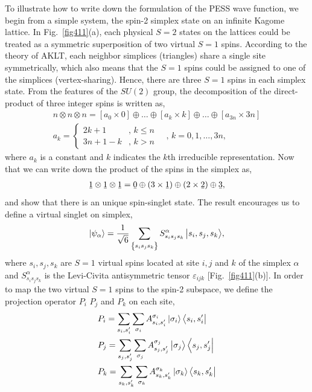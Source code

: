 To illustrate how to write down the formulation of the PESS wave function, we begin from a simple system, the spin-2 simplex state on an infinite Kagome lattice. In Fig.~\ref{fig411}(a), each physical $S=2$ states on the lattices could be treated as a symmetric superposition of two virtual $S=1$ spins. According to the theory of AKLT, each neighbor simplices (triangles) share a single site symmetrically, which also means that the $S=1$ spins could be assigned to one of the simplices (vertex-sharing). Hence, there are three $S=1$ spins in each simplex state. From the features of the $SU(2)$ group, the decomposition of the direct-product of three integer spins is written as, 
\begin{align}
	\label{su2}
	n \otimes n \otimes n = [a_0 \times 0] \oplus \dots \oplus [a_k \times k] \oplus \dots \oplus [a_{3n} \times 3n] \\
	a_k = \begin{cases}
		2k + 1 & \text{, $k \leq n$} \\
		3n + 1 - k & \text{, $k > n$} 
	\end{cases}
	\quad \text{, } k = 0, 1, \dots , 3n ,
\end{align}
where $a_k$ is a constant and $k$ indicates the $k$th irreducible representation. Now that we can write down the product of the spins in the simplex as,  
\begin{align}
	\label{111}
	\barbelow{1} \otimes \barbelow{1} \otimes \barbelow{1} = \barbelow{0} \oplus \left( 3 \times \barbelow{1} \right) \oplus \left( 2 \times \barbelow{2} \right) \oplus \barbelow{3},
\end{align}
and show that there is an unique spin-singlet state. The result encourages us to define a virtual singlet on simplex,
\begin{align}
	\Ket{\psi_{\alpha}} = \frac{1}{\sqrt{6}} \sum_{\left\{ s_i s_j s_k\right\}}{S^{\alpha}_{s_i s_j s_k}\Ket{s_i, s_j, s_k}},
\end{align}
where $s_i,s_j,s_k$ are $S=1$ virtual spins located at site $i,j$ and $k$ of the simplex $\alpha$ and $S^{\alpha}_{s_i s_j s_k}$ is the Levi-Civita antisymmetric tensor $\varepsilon_{ijk}$ [Fig.~\ref{fig411}(b)]. In order to map the two virtual $S=1$ spins to the spin-2 subspace, we define the projection operator $P_i$ $P_j$ and $P_k$ on each site,
\begin{align}
	&P_i = \sum_{s_i,s^{\prime}_{i}}\sum_{\sigma_i}{A^{\sigma_i}_{s_i,s_i^{\prime}}\Ket{\sigma_i}\Bra{s_i,s_i^{\prime}}} \\
	&P_j = \sum_{s_j,s^{\prime}_{j}}\sum_{\sigma_j}{A^{\sigma_j}_{s_j,s_j^{\prime}}\Ket{\sigma_j}\Bra{s_j,s_j^{\prime}}} \\
	&P_k = \sum_{s_k,s^{\prime}_{k}}\sum_{\sigma_k}{A^{\sigma_k}_{s_k,s_k^{\prime}}\Ket{\sigma_k}\Bra{s_k,s_k^{\prime}}}
\end{align}
